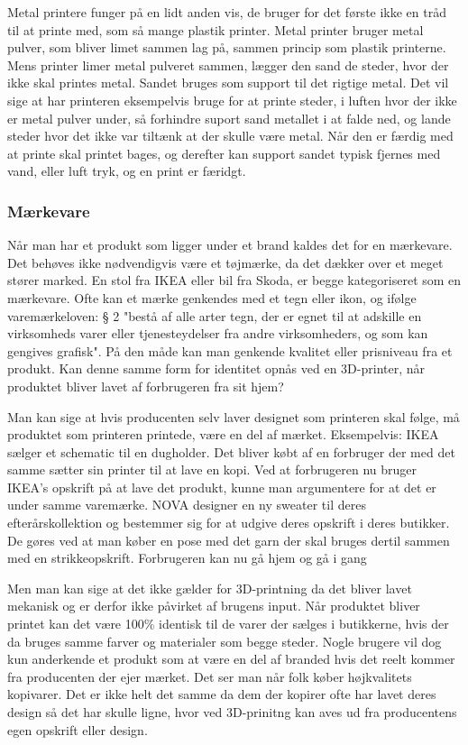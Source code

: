 Metal printere funger på en lidt anden vis, de bruger for det første ikke en tråd til at printe med, som så mange plastik printer. Metal printer bruger metal pulver, som bliver limet sammen lag på, sammen princip som plastik printerne. 
Mens printer limer metal pulveret sammen, lægger den sand de steder, hvor der ikke skal printes metal. Sandet bruges som support til det rigtige metal. Det vil sige at har printeren eksempelvis bruge for at printe steder, i luften hvor der ikke er metal pulver under, så forhindre suport sand metallet i at falde ned, og lande steder hvor det ikke var tiltænk at der skulle være metal.
Når den er færdig med at printe skal printet bages, og derefter kan support sandet typisk fjernes med vand, eller luft tryk, og en print er færidgt.

\subsubsection{Mærkevare}

Når man har et produkt som ligger under et brand kaldes det for en mærkevare. Det behøves ikke nødvendigvis være et tøjmærke, da det dækker over et meget stører marked.  En stol fra IKEA eller bil fra Skoda, er begge kategoriseret som en mærkevare.  
Ofte kan et mærke genkendes med et tegn eller ikon, og ifølge varemærkeloven: § 2 "bestå af alle arter tegn, der er egnet til at adskille en virksomheds varer eller tjenesteydelser fra andre virksomheders, og som kan gengives grafisk". På den måde kan man genkende kvalitet eller prisniveau fra et produkt.
Kan denne samme form for identitet opnås ved en 3D-printer, når produktet bliver lavet af forbrugeren fra sit hjem?

Man kan sige at hvis producenten selv laver designet som printeren skal følge, må produktet som printeren printede, være en del af mærket. Eksempelvis: IKEA sælger et schematic til en dugholder. Det bliver købt af en forbruger der med det samme sætter sin printer til at lave en kopi. Ved at forbrugeren nu bruger IKEA’s opskrift på at lave det produkt, kunne man argumentere for at det er under samme varemærke. NOVA designer en ny sweater til deres efterårskollektion og bestemmer sig for at udgive deres opskrift i deres butikker. De gøres ved at man køber en pose med det garn der skal bruges dertil sammen med en strikkeopskrift. Forbrugeren kan nu gå hjem og gå i gang

Men man kan sige at det ikke gælder for 3D-printning da det bliver lavet mekanisk og er derfor ikke påvirket af brugens input. Når produktet bliver printet kan det være 100\% identisk til de varer der sælges i butikkerne, hvis der da bruges samme farver og materialer som begge steder. 
Nogle brugere vil dog kun anderkende et produkt som at være en del af branded hvis det reelt kommer fra producenten der ejer mærket. Det ser man når folk køber højkvalitets kopivarer. Det er ikke helt det samme da dem der kopirer ofte har lavet deres design så det har skulle ligne, hvor ved 3D-prinitng kan aves ud fra producentens egen opskrift eller design.


